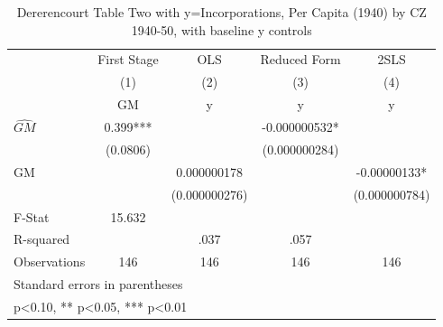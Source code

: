 \begin{table}[htbp]\centering
\def\sym#1{\ifmmode^{#1}\else\(^{#1}\)\fi}
\caption{Dererencourt Table Two with y=Incorporations, Per Capita (1940) by CZ 1940-50, with baseline y controls}
\begin{tabular}{l*{4}{c}}
\toprule
                    & First Stage   &         OLS   &Reduced Form   &        2SLS   \\
                    &\multicolumn{1}{c}{(1)}&\multicolumn{1}{c}{(2)}&\multicolumn{1}{c}{(3)}&\multicolumn{1}{c}{(4)}\\
                    &\multicolumn{1}{c}{GM}&\multicolumn{1}{c}{y}&\multicolumn{1}{c}{y}&\multicolumn{1}{c}{y}\\
\midrule
$\hat{GM}$          &       0.399***&               &-0.000000532*  &               \\
                    &    (0.0806)   &               &(0.000000284)   &               \\
\addlinespace
GM                  &               & 0.000000178   &               & -0.00000133*  \\
                    &               &(0.000000276)   &               &(0.000000784)   \\
\midrule
F-Stat              &      15.632   &               &               &               \\
R-squared           &               &        .037   &        .057   &               \\
Observations        &         146   &         146   &         146   &         146   \\
\bottomrule
\multicolumn{5}{l}{\footnotesize Standard errors in parentheses}\\
\multicolumn{5}{l}{\footnotesize * p<0.10, ** p<0.05, *** p<0.01}\\
\end{tabular}
\end{table}
